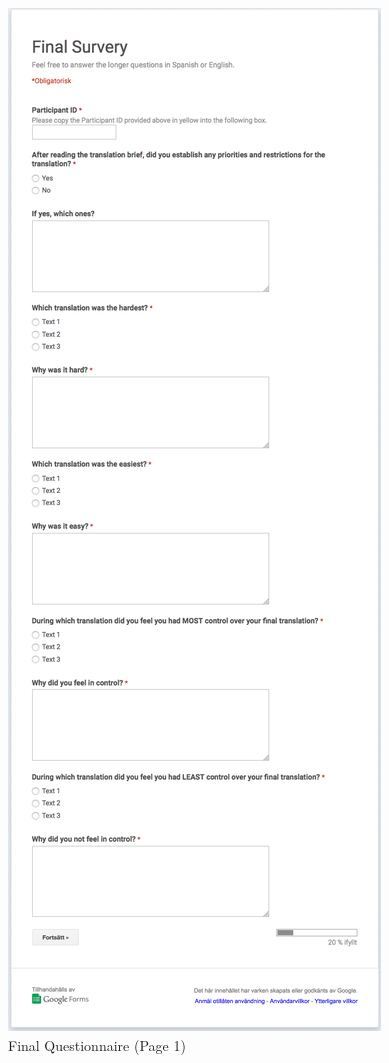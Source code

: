 \begin{figure}[h]
\myfloatalign
\includegraphics[height=\textheight]{img/final_questionnaire/final_1.png}
\caption{Final Questionnaire (Page 1)}
\end{figure}

